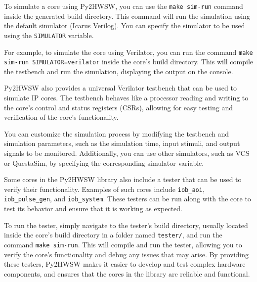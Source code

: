 %

To simulate a core using Py2HWSW, you can use the \texttt{make sim-run} command inside the generated build directory. This command will run the simulation using the default simulator (Icarus Verilog).
You can specify the simulator to be used using the \texttt{SIMULATOR} variable.

For example, to simulate the core using Verilator, you can run the command \texttt{make sim-run SIMULATOR=verilator} inside the core's build directory. This will compile the testbench and run the simulation, displaying the output on the console.

Py2HWSW also provides a universal Verilator testbench that can be used to simulate IP cores. The testbench behaves like a processor reading and writing to the core's control and status registers (CSRs), allowing for easy testing and verification of the core's functionality.

You can customize the simulation process by modifying the testbench and simulation parameters, such as the simulation time, input stimuli, and output signals to be monitored. Additionally, you can use other simulators, such as VCS or QuestaSim, by specifying the corresponding simulator variable.

Some cores in the Py2HWSW library also include a tester that can be used to verify their functionality. Examples of such cores include \texttt{iob\_aoi}, \texttt{iob\_pulse\_gen}, and \texttt{iob\_system}. These testers can be run along with the core to test its behavior and ensure that it is working as expected.

To run the tester, simply navigate to the tester's build directory, usually located inside the core's build directory in a folder named \texttt{tester/}, and run the command \texttt{make sim-run}.
This will compile and run the tester, allowing you to verify the core's functionality and debug any issues that may arise.
By providing these testers, Py2HWSW makes it easier to develop and test complex hardware components, and ensures that the cores in the library are reliable and functional.

